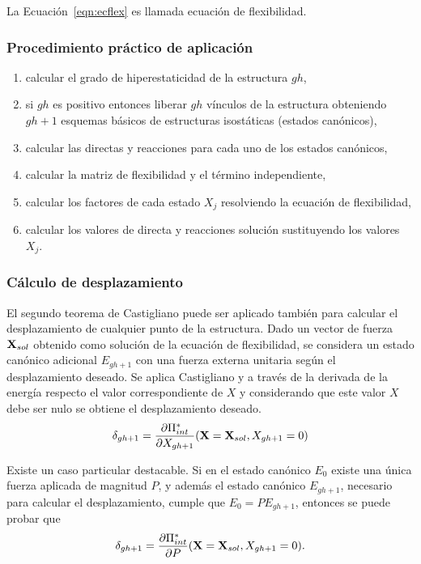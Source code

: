 La Ecuación~\eqref{eqn:ecflex} es llamada ecuación de flexibilidad.
	
\subsubsection{Procedimiento práctico de aplicación}

\begin{enumerate}
\item calcular el grado de hiperestaticidad de la estructura $gh$,
\item si $gh$ es positivo entonces liberar $gh$ vínculos de la estructura obteniendo $gh+1$ esquemas básicos de estructuras isostáticas (estados canónicos),
\item calcular las directas y reacciones para cada uno de los estados canónicos,
\item calcular la matriz de flexibilidad y el término independiente,
\item calcular los factores de cada estado $X_j$ resolviendo la ecuación de flexibilidad,
\item calcular los valores de directa y reacciones solución sustituyendo los valores $X_j$.
\end{enumerate}


\subsubsection{Cálculo de desplazamiento}

El segundo teorema de Castigliano puede ser aplicado también para calcular el desplazamiento de cualquier punto de la estructura. %
%
Dado un vector de fuerza ${\bf X}_{sol}$ obtenido como solución de la ecuación de flexibilidad, se considera un estado canónico adicional $E_{gh+1}$ con una fuerza externa unitaria según el desplazamiento deseado. %
%
Se aplica Castigliano y a través de la derivada de la energía respecto el valor correspondiente de $X$ y considerando que este valor $X$ debe ser nulo se obtiene el desplazamiento deseado. %
%
\begin{equation}
\delta_{gh+1} = \frac{\partial \Pi^*_{int}}  { \partial X_{gh+1} } ({\bf X} = {\bf X}_{sol}, X_{gh+1}=0)
\end{equation}

Existe un caso particular destacable. %
%
Si en el estado canónico $E_0$ existe una única fuerza aplicada de magnitud $P$, y además el estado canónico $E_{gh+1}$, necesario para calcular el desplazamiento, cumple que $E_0 = P E_{gh+1}$, entonces se puede probar que %
%
\begin{equation}
\delta_{gh+1} = \frac{\partial \Pi^*_{int}}  { \partial P } ({\bf X} = {\bf X}_{sol}, X_{gh+1}=0).
\end{equation}
%

